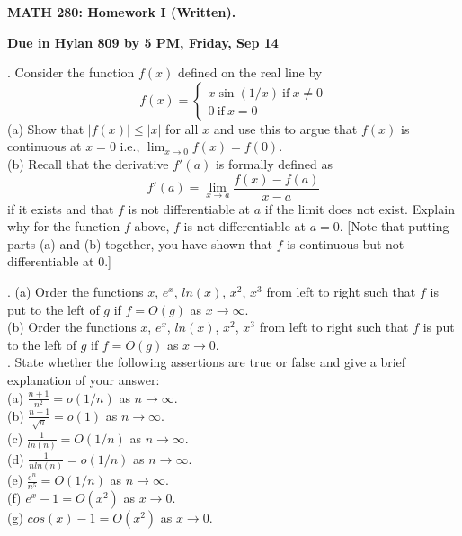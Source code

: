 \documentclass[12 pt]{article}
\newcommand{\sine}{\operatorname{sin}}
\begin{document}
\centerline{\bf MATH 280: Homework I (Written). }
\centerline{\bf Due in Hylan 809 by 5 PM, Friday, Sep 14}

\bigskip

. Consider the function $f(x)$ defined on the real line by
$$
f(x) = \begin{cases}
x \sine(1/x) \ \text{if} \  x \neq 0 \\
0 \ \text{if} \  x = 0
\end{cases}
$$
(a) Show that $|f(x)| \leq |x|$ for all $x$ and use this to argue that 
$f(x)$ is continuous at $x=0$ i.e., $\displaystyle\lim_{x \to 0} f(x) = f(0)$. \\

\noindent
(b) Recall that the derivative $f'(a)$ is formally defined as 
$$
f'(a) = \lim_{x \to a} \frac{f(x)-f(a)}{x-a}
$$
if it exists and that $f$ is not differentiable at $a$ if the limit does not exist. 
Explain why for the function $f$ above, $f$ is not differentiable at $a=0$.
[Note that putting parts (a) and (b) together, you have shown that $f$ is continuous 
but not differentiable at $0$.]

\medskip

. 
(a) Order the functions $x$, $e^x$, $ln(x)$, $x^2$, $x^3$ from left to right such 
that $f$ is put to the left of $g$ if $f=O(g)$ as $x \to \infty$. \\

\noindent
(b) Order the functions $x$, $e^x$, $ln(x)$, $x^2$, $x^3$ from left to right 
such that $f$ is put to the left of $g$ if $f=O(g)$ as $x \to 0$. \\

. State whether the following assertions are true or false and give a brief explanation of your answer: \\
(a) $\frac{n+1}{n^2} = o(1/n)$ as $n \to \infty$. \\
(b) $\frac{n+1}{\sqrt{n}}=o(1)$ as $n \to \infty$. \\
(c) $\frac{1}{ln(n)} = O(1/n)$ as $n \to \infty$. \\
(d) $\frac{1}{n ln(n)} = o(1/n)$ as $n \to \infty$. \\
(e) $\frac{e^n}{n^5} = O(1/n)$ as $n \to \infty$. \\
(f) $e^x-1 = O(x^2)$ as $x \to 0$. \\
(g) $cos(x)-1 = O(x^2)$ as $x \to 0$. \\
\end{document}
